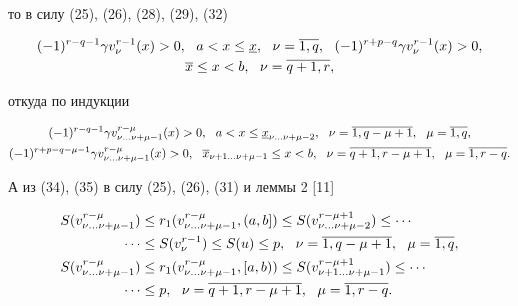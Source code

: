 то в силу (25), (26), (28), (29), (32)


\begin{gather}


(-1)^{r-q-1}\gamma v^{r-1}_\nu(x)>0,\ \ a<x\le \u{x},\ \ \nu=\o{1,q},\ \ 


(-1)^{r+p-q}\gamma v^{r-1}_\nu(x)>0,\\


\o{x}\le x<b,\ \ \nu=\o{q+1,r},\notag


\end{gather}


откуда по индукции


\begin{gather}


(-1)^{r-q-1}\gamma v^{r-\mu}_{\nu\dotsc\nu+\mu-1}(x)>0,\ \


a<x\le\u{x}_{\nu\dotsc\nu+\mu-2},


\ \ \nu=\o{1,q-\mu+1},\ \ \mu=\o{1,q},\\


%


(-1)^{r+p-q-\mu-1}\gamma v^{r-\mu}_{\nu\dotsc\nu+\mu-1}(x)>0,\ \


\o{x}_{\nu+1\dotsc\nu+\mu-1}\le x<b,


\ \ \nu=\o{q+1,r-\mu+1},


\ \ \mu=\o{1,r-q}.


\end{gather}


А из (34), (35) в силу (25), (26), (31) и леммы 2 [11]


\begin{align}


S(v^{r-\mu}_{\nu\dotsc\nu+\mu-1})&\le


r_1( v^{r-\mu}_{\nu\dotsc\nu+\mu-1},(a,b])\le


S( v^{r-\mu+1}_{\nu\dotsc\nu+\mu-2})\le\dotsb \notag \\


%


\dotsb&\le S( v^{r-1}_\nu)\le S(u)\le p,\ \ \nu=\o{1, q-\mu+1},


\ \ \mu=\o{1,q},\\


%


S( v^{r-\mu}_{\nu\dotsc\nu+\mu-1})&\le


r_1( v^{r-\mu}_{\nu\dotsc\nu+\mu-1}, [a,b))\le


S( v^{r-\mu+1}_{\nu+1\dotsc\nu+\mu-1})\le\dotsb \notag \\


%


\dotsb &\le p,\ \ \nu=\o{q+1, r-\mu+1},


\ \ \mu=\o{1,r-q}.


\end{align}








